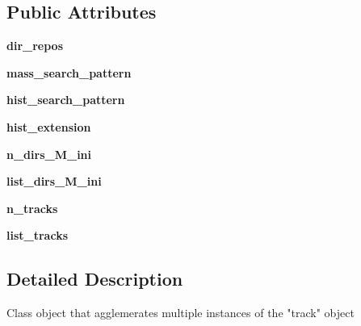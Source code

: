 \subsection*{Public Attributes}
\begin{DoxyCompactItemize}
\item 
\mbox{\label{classasamba_1_1var__def_1_1tracks_abb5a3f5f51f42ffa33d17cfa59afdf49}} 
{\bfseries dir\+\_\+repos}
\item 
\mbox{\label{classasamba_1_1var__def_1_1tracks_a05e8ca115e34ba8146953d8b5ad95ed2}} 
{\bfseries mass\+\_\+search\+\_\+pattern}
\item 
\mbox{\label{classasamba_1_1var__def_1_1tracks_a714538f69e4e307a4c6fc6608da928a0}} 
{\bfseries hist\+\_\+search\+\_\+pattern}
\item 
\mbox{\label{classasamba_1_1var__def_1_1tracks_aa594311bba704adf5f31e33c8edc3537}} 
{\bfseries hist\+\_\+extension}
\item 
\mbox{\label{classasamba_1_1var__def_1_1tracks_ad360b83822ae08c5061886f32846ebf0}} 
{\bfseries n\+\_\+dirs\+\_\+\+M\+\_\+ini}
\item 
\mbox{\label{classasamba_1_1var__def_1_1tracks_a5eec02ca2b36e289fc3502ec9fd3995f}} 
{\bfseries list\+\_\+dirs\+\_\+\+M\+\_\+ini}
\item 
\mbox{\label{classasamba_1_1var__def_1_1tracks_afda95e1c2639e216c0e72ef57324acb4}} 
{\bfseries n\+\_\+tracks}
\item 
\mbox{\label{classasamba_1_1var__def_1_1tracks_a94088762399d82745bd830791518c155}} 
{\bfseries list\+\_\+tracks}
\end{DoxyCompactItemize}


\subsection{Detailed Description}
\begin{DoxyVerb}Class object that agglemerates multiple instances of the "track" object
\end{DoxyVerb}
 

